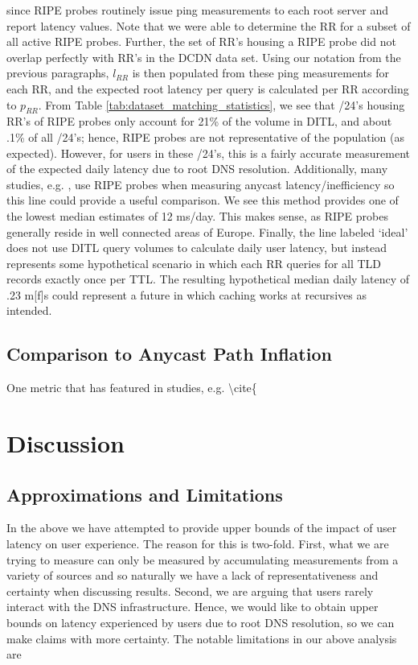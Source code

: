 \documentclass[sigconf,nonacm,10pt]{acmart}
\begin{document}
since RIPE probes routinely issue ping measurements to each root server
and report latency values. Note that we were able to determine the RR
for a subset of all active RIPE probes. Further, the set of RR's housing
a RIPE probe did not overlap perfectly with RR's in the DCDN data set.
Using our notation from the previous paragraphs, \(l_{RR}\) is then
populated from these ping measurements for each RR, and the expected
root latency per query is calculated per RR according to \(p_{RR}\).
From Table \ref{tab:dataset_matching_statistics}, we see that /24's
housing RR's of RIPE probes only account for 21\% of the volume in DITL,
and about .1\% of all /24's; hence, RIPE probes are not representative
of the population (as expected). However, for users in these /24's, this
is a fairly accurate measurement of the expected daily latency due to
root DNS resolution. Additionally, many studies, e.g.
\cite{li_levin_spring_bhattacharjee_2018}, use RIPE probes when
measuring anycast latency/inefficiency so this line could provide a
useful comparison. We see this method provides one of the lowest median
estimates of 12 ms/day. This makes sense, as RIPE probes generally
reside in well connected areas of Europe. \break \break
Finally, the line labeled `ideal' does not use DITL query volumes to
calculate daily user latency, but instead represents some hypothetical
scenario in which each RR queries for all TLD records exactly once per
TTL. The resulting hypothetical median daily latency of .23 m{[}f{]}s
could represent a future in which caching works at recursives as
intended.

\subsection{Comparison to Anycast Path
Inflation}\label{comparison-to-anycast-path-inflation}

\label{sec:rr_global_look_api} One metric that has featured in studies,
e.g. \textbackslash{}cite\{

\section{Discussion}\label{discussion}

\subsection{Approximations and
Limitations}\label{approximations-and-limitations}

\label{sec:discussion_approximations} In the above we have attempted to
provide upper bounds of the impact of user latency on user experience.
The reason for this is two-fold. First, what we are trying to measure
can only be measured by accumulating measurements from a variety of
sources and so naturally we have a lack of representativeness and
certainty when discussing results. Second, we are arguing that users
rarely interact with the DNS infrastructure. Hence, we would like to
obtain upper bounds on latency experienced by users due to root DNS
resolution, so we can make claims with more certainty. \break \break
The notable limitations in our above analysis are
\end{document}
